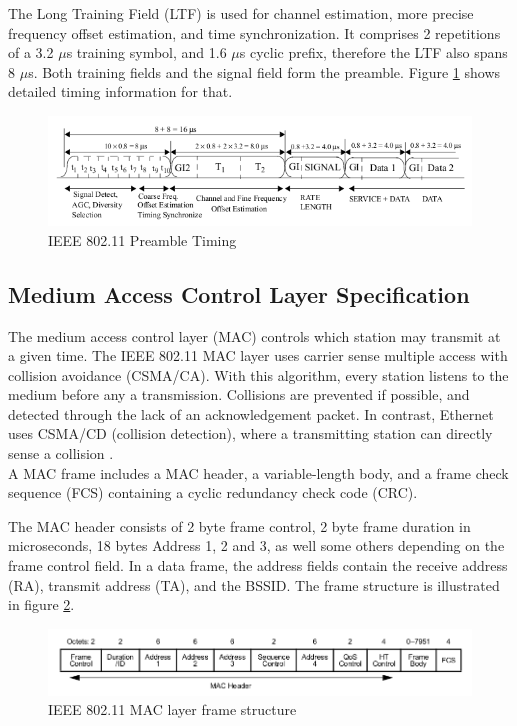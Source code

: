 The Long Training Field (LTF) is used for channel estimation, more precise frequency offset estimation, and time synchronization. It comprises 2 repetitions of a 3.2 $\mu$s training symbol, and 1.6 $\mu$s cyclic prefix, therefore the LTF also spans 8 $\mu$s. Both training fields and the signal field form the preamble. Figure \ref{fig:preamble} shows detailed timing information for that.

\begin{figure}[H]
	\centering
	\includegraphics[width=\textwidth]{gfx/images/preamble-format}
	\caption[IEEE 802.11 Preamble Timing]{IEEE 802.11 Preamble Timing \cite{ieee2012}}
	\label{fig:preamble}
\end{figure}


\subsection{Medium Access Control Layer Specification}

The medium access control layer (MAC) controls which station may transmit at a given time. The IEEE 802.11 MAC layer uses carrier sense multiple access with collision avoidance (CSMA/CA). With this algorithm, every station listens to the medium before any a transmission. Collisions are prevented if possible, and detected through the lack of an acknowledgement packet. In contrast, Ethernet uses CSMA/CD (collision detection), where a transmitting station can directly sense a collision \cite{NEEDED}.\\

A MAC frame includes a MAC header, a variable-length body, and a frame check sequence (FCS) containing a cyclic redundancy check code (CRC).

The MAC header consists of 2 byte frame control, 2 byte frame duration in microseconds, 18 bytes Address 1, 2 and 3, as well some others depending on the frame control field. In a data frame, the address fields contain the receive address (RA), transmit address (TA), and the BSSID. The frame structure is illustrated in figure \ref{fig:mac-format}.

\begin{figure}[H]
	\centering
	\includegraphics[width=\textwidth]{gfx/images/mac-format}
	\caption[IEEE 802.11 MAC layer frame structure]{IEEE 802.11 MAC layer frame structure \cite{ieee2012}}
	\label{fig:mac-format}
\end{figure}


